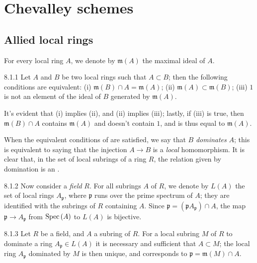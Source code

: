 \section{Chevalley schemes}
\label{1-schemes-8}

\subsection{Allied local rings}
\label{1-schemes-8.1}

For every local ring $A$, we denote by $\mathfrak{m}(A)$ the maximal ideal of
$A$.

\begin{envs}[Lemma]{8.1.1}
\label{lem-1.8.1.1}
Let $A$ and $B$ be two local rings such that $A\subset B$;
then the following conditions are equivalent: (i)
$\mathfrak{m}(B)\cap A=\mathfrak{m}(A)$; (ii)
$\mathfrak{m}(A)\subset\mathfrak{m}(B)$; (iii) $1$ is not an element of
the ideal of $B$ generated by $\mathfrak{m}(A)$.
\end{envs}

It's evident that (i) implies (ii), and (ii) implies (iii); lastly, if (iii) is
true, then $\mathfrak{m}(B)\cap A$ contains $\mathfrak{m}(A)$ and doesn't
contain $1$, and is thus equal to $\mathfrak{m}(A)$.

When the equivalent conditions of  are satisfied, we say that $B$
\emph{dominates} $A$; this is equivalent to saying that the injection $A\to B$
is a \emph{local} homomorphism. It is clear that, in the set of local subrings
of a ring $R$, the relation given by domination is an .

\begin{env}{8.1.2}
\label{env-1.8.1.2}
Now consider a \emph{field} $R$. For all subrings $A$ of
$R$, we denote by $L(A)$ the set of local rings $A_\mathfrak{p}$, where
$\mathfrak{p}$ runs over the prime spectrum of $A$; they are identified with the
subrings of $R$ containing $A$. Since
$\mathfrak{p}=(\mathfrak{p}A_\mathfrak{p})\cap A$, the map $\mathfrak{p}\to A_\mathfrak{p}$
from ${\mathop{\mathrm{Spec}}\nolimits}\,(A)$ to $L(A)$ is bijective.
\end{env}

\begin{envs}[Lemma]{8.1.3}
\label{lem-1.8.1.3}
Let $R$ be a field, and $A$ a subring of $R$. For a
local subring $M$ of $R$ to dominate a ring $A_\mathfrak{p}\in L(A)$ it is
necessary and sufficient that $A\subset M$; the local ring $A_\mathfrak{p}$
dominated by $M$ is then unique, and corresponds to
$\mathfrak{p}=\mathfrak{m}(M)\cap A$.
\end{envs}

